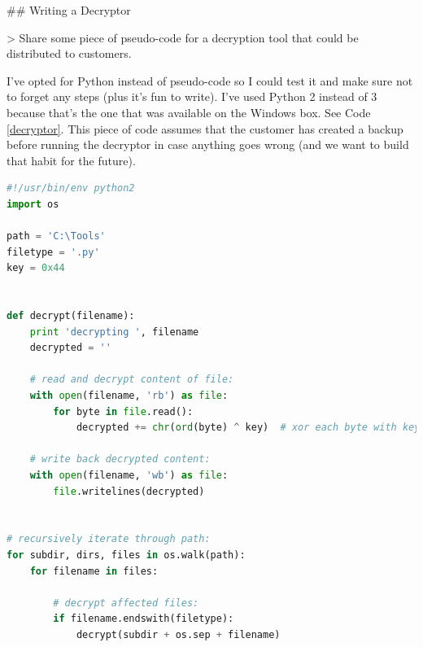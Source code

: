 \begin{markdown}

## Writing a Decryptor

> \noindent Share some piece of pseudo-code for a decryption tool that could be distributed to customers.

\noindent I've opted for Python instead of pseudo-code so I could test it and make sure not to forget any steps (plus it's fun to write). I've used Python 2 instead of 3 because that's the one that was available on the Windows box. See Code \ref{decryptor}. \n
This piece of code assumes that the customer has created a backup before running the decryptor in case anything goes wrong (and we want to build that habit for the future).

\end{markdown}
\begin{lstlisting}[language=python,name={decryptor.py},label={decryptor}]
#!/usr/bin/env python2
import os

path = 'C:\Tools'
filetype = '.py'
key = 0x44


def decrypt(filename):
    print 'decrypting ', filename
    decrypted = ''

    # read and decrypt content of file:
    with open(filename, 'rb') as file:
        for byte in file.read():
            decrypted += chr(ord(byte) ^ key)  # xor each byte with key.

    # write back decrypted content:
    with open(filename, 'wb') as file:
        file.writelines(decrypted)


# recursively iterate through path:
for subdir, dirs, files in os.walk(path):
    for filename in files:

        # decrypt affected files:
        if filename.endswith(filetype):
            decrypt(subdir + os.sep + filename)
\end{lstlisting}
